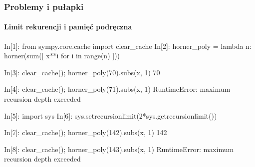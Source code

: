 \documentclass[10pt]{beamer}
\begin{document}
\begin{frame}[fragile]
  \frametitle{Problemy i pułapki}
  \framesubtitle{Limit rekurencji i pamięć podręczna}

  \begin{python}
    In[1]: from sympy.core.cache import clear_cache
    In[2]: horner_poly = lambda n: horner(sum([ x**i for i in range(n) ]))
  \end{python}

  \begin{python}
    In[3]: clear_cache(); horner_poly(70).subs(x, 1)
    70
  \end{python}

  \begin{python}
    In[4]: clear_cache(); horner_poly(71).subs(x, 1)
    RuntimeError: maximum recursion depth exceeded
  \end{python}

  \pause

  \begin{python}
    In[5]: import sys
    In[6]: sys.setrecursionlimit(2*sys.getrecursionlimit())
  \end{python}

  \begin{python}
    In[7]: clear_cache(); horner_poly(142).subs(x, 1)
    142
  \end{python}

  \begin{python}
    In[8]: clear_cache(); horner_poly(143).subs(x, 1)
    RuntimeError: maximum recursion depth exceeded
  \end{python}
\end{frame}

\end{document}
